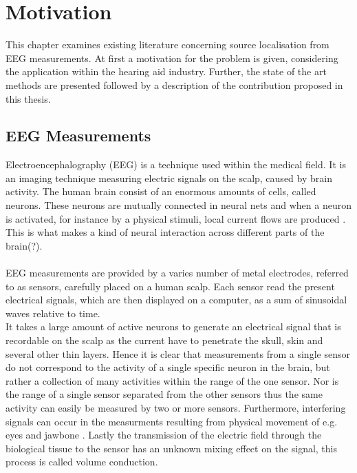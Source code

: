 \chapter{Motivation}\label{ch:motivation}
This chapter examines existing literature concerning source localisation from EEG measurements. At first a motivation for the problem is given, considering the application within the hearing aid industry. Further, the state of the art methods are presented followed by a description of the contribution proposed in this thesis.

\section{EEG Measurements}
Electroencephalography (EEG) is a technique used within the medical field. It is an imaging technique measuring electric signals on the scalp, caused by brain activity. 
The human brain consist of an enormous amounts of cells, called neurons. These neurons are mutually connected in neural nets and when a neuron is activated, for instance by a physical stimuli, local current flows are produced \cite{fundamentalEEG}. This is what makes a kind of neural interaction across different parts of the brain(?). 
\\
\\
EEG measurements are provided by a varies number of metal electrodes, referred to as sensors, carefully placed on a human scalp. Each sensor read the present electrical signals, which are then displayed on a computer, as a sum of sinusoidal waves relative to time.
\\
It takes a large amount of active neurons to generate an electrical signal that is recordable on the scalp as the current have to penetrate the skull, skin and several other thin layers.
Hence it is clear that measurements from a single sensor do not correspond to the activity of a single specific neuron in the brain, but rather a collection of many activities within the range of the one sensor.
Nor is the range of a single sensor separated from the other sensors thus the same activity can easily be measured by two or more sensors.
Furthermore, interfering signals can occur in the measurments resulting from physical movement of e.g. eyes and jawbone \cite{fundamentalEEG}. 
Lastly the transmission of the electric field through the biological tissue to the sensor has an unknown mixing effect on the signal, this process is called volume conduction\cite[p. 68]{EEGsignalprocessing}\cite{Van2019}.\\ \\
